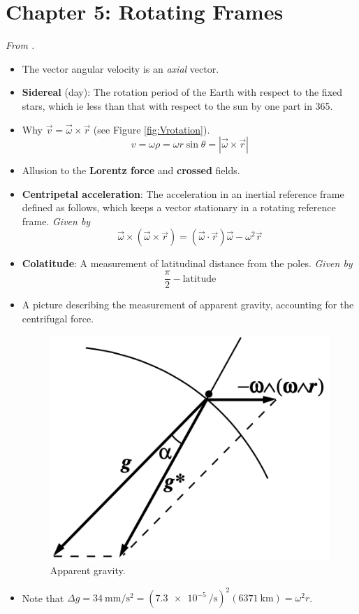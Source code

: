 \documentclass[../notes.tex]{subfiles}
\begin{document}
\section{Chapter 5: Rotating Frames}
\emph{From \textcite{bib:KibbleBerkshire}.}
\begin{itemize}
    \item {}The vector angular velocity is an \emph{axial} vector.
    \item \textbf{Sidereal} (day): The rotation period of the Earth with respect to the fixed stars, which ie less than that with respect to the sun by one part in 365.
    \item Why $\vec{v}=\vec{\omega}\times\vec{r}$ (see Figure \ref{fig:Vrotation}).
    \begin{equation*}
        v = \omega\rho = \omega r\sin\theta = |\vec{\omega}\times\vec{r}|
    \end{equation*}
    \item Allusion to the \textbf{Lorentz force} and \textbf{crossed} fields.
    \item \textbf{Centripetal acceleration}: The acceleration in an inertial reference frame defined as follows, which keeps a vector stationary in a rotating reference frame. \emph{Given by}
    \begin{equation*}
        \vec{\omega}\times(\vec{\omega}\times\vec{r}) = (\vec{\omega}\cdot\vec{r})\vec{\omega}-\omega^2\vec{r}
    \end{equation*}
    \item \textbf{Colatitude}: A measurement of latitudinal distance from the poles. \emph{Given by}
    \begin{equation*}
        \frac{\pi}{2}-\text{latitude}
    \end{equation*}
    \item A picture describing the measurement of apparent gravity, accounting for the centrifugal force.
    \begin{figure}[h!]
        \centering
        \includegraphics[width=0.25\linewidth]{../ExtFiles/apparentGravity.png}
        \caption{Apparent gravity.}
        \label{fig:apparentGravity}
    \end{figure}
    \item Note that $\Delta g=\SI[per-mode=symbol]{34}{\milli\meter\per\second\squared}=(\SI{7.3e-5}{\per\second})^2(\SI{6371}{\kilo\meter})=\omega^2r$.

\end{itemize}
\end{document}
